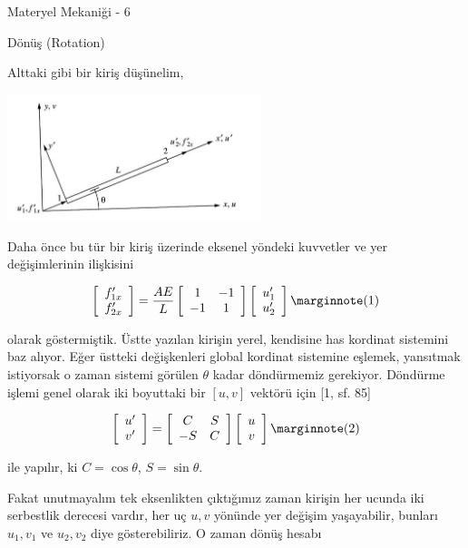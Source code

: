 \documentclass[12pt,fleqn]{article}\usepackage{../../common}
\begin{document}
Materyel Mekaniği - 6

Dönüş (Rotation)

Alttaki gibi bir kiriş düşünelim,

\includegraphics[width=20em]{phy_020_strs_06_01.jpg}

Daha önce bu tür bir kiriş üzerinde eksenel yöndeki kuvvetler ve yer
değişimlerinin ilişkisini

$$
\left[\begin{array}{c}
f'_{1x} \\ f'_{2x}
\end{array}\right] =
\frac{AE}{L}
\left[\begin{array}{cc}
1 & -1 \\ -1 & 1
\end{array}\right]
\left[\begin{array}{c}
u'_1 \\ u'_2
\end{array}\right]
\mlabel{1}
$$

olarak göstermiştik. Üstte yazılan kirişin yerel, kendisine has kordinat
sistemini baz alıyor. Eğer üstteki değişkenleri global kordinat sistemine
eşlemek, yansıtmak istiyorsak o zaman sistemi görülen $\theta$ kadar döndürmemiz
gerekiyor. Döndürme işlemi genel olarak iki boyuttaki bir $[u, v]$ vektörü için
[1, sf. 85]

$$
\left[\begin{array}{c}
u' \\ v'
\end{array}\right] =
\left[\begin{array}{cc}
C & S \\ -S & C
\end{array}\right]
\left[\begin{array}{c}
u \\ v
\end{array}\right]
\mlabel{2}
$$

ile yapılır, ki $C = \cos\theta$, $S = \sin\theta$.

Fakat unutmayalım tek eksenlikten çıktığımız zaman kirişin her ucunda iki
serbestlik derecesi vardır, her uç $u,v$ yönünde yer değişim yaşayabilir,
bunları $u_1,v_1$ ve $u_2,v_2$ diye gösterebiliriz. O zaman dönüş hesabı
\end{document}
